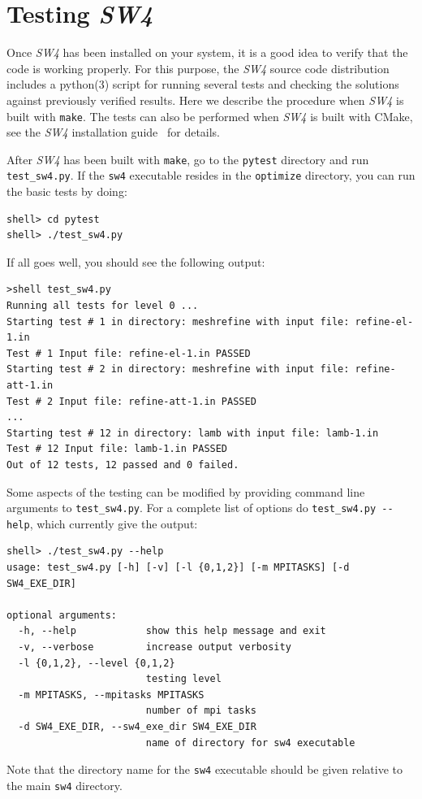 \documentclass[11pt]{report}
\begin{document}
\chapter{Testing \emph{SW4}}\label{cha:testing-sw4}

Once \emph{SW4} has been installed on your system, it is a good idea to verify that the code is
working properly. For this purpose, the \emph{SW4} source code distribution includes a python(3)
script for running several tests and checking the solutions against previously verified
results. Here we describe the procedure when \emph{SW4} is built with {\tt make}. The tests can also
be performed when \emph{SW4} is built with CMake, see the \emph{SW4} installation
guide~\cite{SW4-install} for details.

After \emph{SW4} has been built with \verb+make+, go to the \verb+pytest+ directory and run
\verb+test_sw4.py+. If the \verb+sw4+ executable resides in the \verb+optimize+ directory, you can
run the basic tests by doing:
\begin{verbatim}
shell> cd pytest
shell> ./test_sw4.py
\end{verbatim}
If all goes well, you should see the following output:
\begin{verbatim}
>shell test_sw4.py
Running all tests for level 0 ...
Starting test # 1 in directory: meshrefine with input file: refine-el-1.in
Test # 1 Input file: refine-el-1.in PASSED
Starting test # 2 in directory: meshrefine with input file: refine-att-1.in
Test # 2 Input file: refine-att-1.in PASSED
...
Starting test # 12 in directory: lamb with input file: lamb-1.in
Test # 12 Input file: lamb-1.in PASSED
Out of 12 tests, 12 passed and 0 failed.
\end{verbatim}
Some aspects of the testing can be modified by providing command line arguments to
\verb+test_sw4.py+. For a complete list of options do \verb+test_sw4.py --help+, which currently
give the output:
\begin{verbatim}
shell> ./test_sw4.py --help
usage: test_sw4.py [-h] [-v] [-l {0,1,2}] [-m MPITASKS] [-d SW4_EXE_DIR]

optional arguments:
  -h, --help            show this help message and exit
  -v, --verbose         increase output verbosity
  -l {0,1,2}, --level {0,1,2}
                        testing level
  -m MPITASKS, --mpitasks MPITASKS
                        number of mpi tasks
  -d SW4_EXE_DIR, --sw4_exe_dir SW4_EXE_DIR
                        name of directory for sw4 executable
\end{verbatim}
Note  that the directory name for the \verb+sw4+ executable should be given relative to the main
\verb+sw4+ directory.
\end{document}
